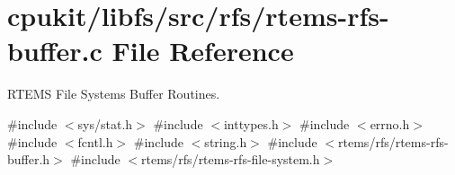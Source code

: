 \hypertarget{rtems-rfs-buffer_8c}{}\section{cpukit/libfs/src/rfs/rtems-\/rfs-\/buffer.c File Reference}
\label{rtems-rfs-buffer_8c}


R\+T\+E\+MS File Systems Buffer Routines.  


{\ttfamily \#include $<$sys/stat.\+h$>$}\newline
{\ttfamily \#include $<$inttypes.\+h$>$}\newline
{\ttfamily \#include $<$errno.\+h$>$}\newline
{\ttfamily \#include $<$fcntl.\+h$>$}\newline
{\ttfamily \#include $<$string.\+h$>$}\newline
{\ttfamily \#include $<$rtems/rfs/rtems-\/rfs-\/buffer.\+h$>$}\newline
{\ttfamily \#include $<$rtems/rfs/rtems-\/rfs-\/file-\/system.\+h$>$}\newline
